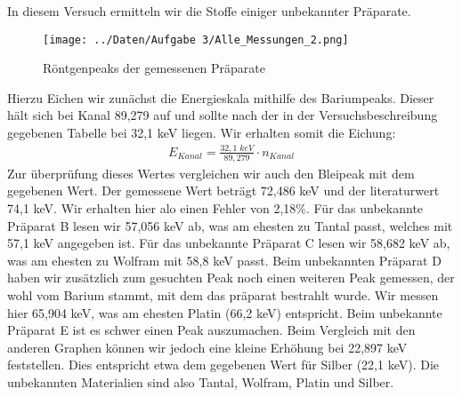 In diesem Versuch ermitteln wir die Stoffe einiger unbekannter Präparate.
\begin{figure}
	\centering
	\texttt{[image: ../Daten/Aufgabe 3/Alle\_Messungen\_2.png]}
	\caption{Röntgenpeaks der gemessenen Präparate}
\end{figure}
Hierzu Eichen wir zunächst die Energieskala mithilfe des Bariumpeaks. Dieser hält sich bei Kanal 89,279 auf und sollte nach der in der Versuchsbeschreibung gegebenen Tabelle bei 32,1 keV liegen. Wir erhalten somit die Eichung:
\begin{align*}
E_{Kanal}=\frac{32,1\; keV}{89,279}\cdot n_{Kanal}
\end{align*}
Zur überprüfung dieses Wertes vergleichen wir auch den Bleipeak mit dem gegebenen Wert. Der gemessene Wert beträgt 72,486 keV und der literaturwert 74,1 keV. Wir erhalten hier alo einen Fehler von 2,18\%. Für das unbekannte Präparat B lesen wir 57,056 keV ab, was am ehesten zu Tantal passt, welches mit 57,1 keV angegeben ist. Für das unbekannte Präparat C lesen wir 58,682 keV ab, was am ehesten zu Wolfram mit 58,8 keV passt. Beim unbekannten Präparat D haben wir zusätzlich zum gesuchten Peak noch einen weiteren Peak gemessen, der wohl vom Barium stammt, mit dem das präparat bestrahlt wurde. Wir messen hier 65,904 keV, was am ehesten Platin (66,2 keV) entspricht. Beim unbekannte Präparat E ist es schwer einen Peak auszumachen. Beim Vergleich mit den anderen Graphen können wir jedoch eine kleine Erhöhung bei 22,897 keV feststellen. Dies entspricht etwa dem gegebenen Wert für Silber (22,1 keV). Die unbekannten Materialien sind also Tantal, Wolfram, Platin und Silber.